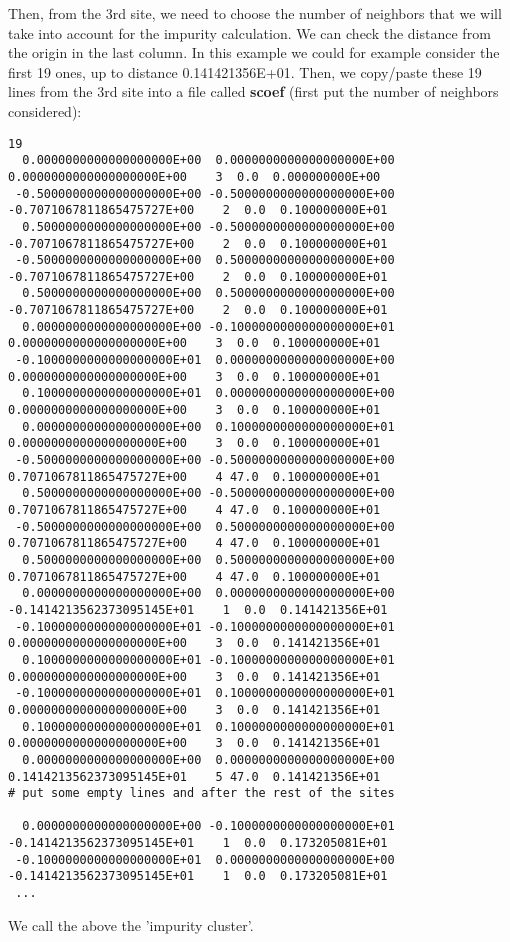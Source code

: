 \documentclass[11pt,fleqn]{book} %
\begin{document}
Then, from the 3rd site, we need to choose the number of neighbors that we will take into account
for the impurity calculation.
We can check the distance from the origin in the last column.
In this example we could for example consider
the first 19 ones, up to distance 0.141421356E+01.
Then, we copy/paste these 19 lines from the 3rd site into a file called \textbf{scoef}
(first put the number of neighbors considered):
\begin{VBox}
{\tiny{
\begin{verbatim}
19
  0.0000000000000000000E+00  0.0000000000000000000E+00  0.0000000000000000000E+00    3  0.0  0.000000000E+00
 -0.5000000000000000000E+00 -0.5000000000000000000E+00 -0.7071067811865475727E+00    2  0.0  0.100000000E+01
  0.5000000000000000000E+00 -0.5000000000000000000E+00 -0.7071067811865475727E+00    2  0.0  0.100000000E+01
 -0.5000000000000000000E+00  0.5000000000000000000E+00 -0.7071067811865475727E+00    2  0.0  0.100000000E+01
  0.5000000000000000000E+00  0.5000000000000000000E+00 -0.7071067811865475727E+00    2  0.0  0.100000000E+01
  0.0000000000000000000E+00 -0.1000000000000000000E+01  0.0000000000000000000E+00    3  0.0  0.100000000E+01
 -0.1000000000000000000E+01  0.0000000000000000000E+00  0.0000000000000000000E+00    3  0.0  0.100000000E+01
  0.1000000000000000000E+01  0.0000000000000000000E+00  0.0000000000000000000E+00    3  0.0  0.100000000E+01
  0.0000000000000000000E+00  0.1000000000000000000E+01  0.0000000000000000000E+00    3  0.0  0.100000000E+01
 -0.5000000000000000000E+00 -0.5000000000000000000E+00  0.7071067811865475727E+00    4 47.0  0.100000000E+01
  0.5000000000000000000E+00 -0.5000000000000000000E+00  0.7071067811865475727E+00    4 47.0  0.100000000E+01
 -0.5000000000000000000E+00  0.5000000000000000000E+00  0.7071067811865475727E+00    4 47.0  0.100000000E+01
  0.5000000000000000000E+00  0.5000000000000000000E+00  0.7071067811865475727E+00    4 47.0  0.100000000E+01
  0.0000000000000000000E+00  0.0000000000000000000E+00 -0.1414213562373095145E+01    1  0.0  0.141421356E+01
 -0.1000000000000000000E+01 -0.1000000000000000000E+01  0.0000000000000000000E+00    3  0.0  0.141421356E+01
  0.1000000000000000000E+01 -0.1000000000000000000E+01  0.0000000000000000000E+00    3  0.0  0.141421356E+01
 -0.1000000000000000000E+01  0.1000000000000000000E+01  0.0000000000000000000E+00    3  0.0  0.141421356E+01
  0.1000000000000000000E+01  0.1000000000000000000E+01  0.0000000000000000000E+00    3  0.0  0.141421356E+01
  0.0000000000000000000E+00  0.0000000000000000000E+00  0.1414213562373095145E+01    5 47.0  0.141421356E+01
# put some empty lines and after the rest of the sites

  0.0000000000000000000E+00 -0.1000000000000000000E+01 -0.1414213562373095145E+01    1  0.0  0.173205081E+01
 -0.1000000000000000000E+01  0.0000000000000000000E+00 -0.1414213562373095145E+01    1  0.0  0.173205081E+01
 ...
\end{verbatim}
}}
\end{VBox}
We call the above the 'impurity cluster'.
\end{document}

